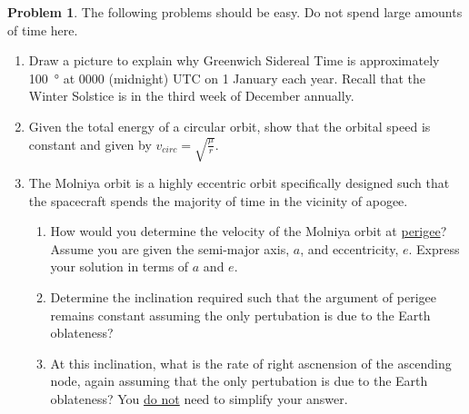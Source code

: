 \documentclass[10pt]{article}
\theoremstyle{definition}
\newtheorem{prob}{Problem}[section]
\newenvironment{subprob}%
{\renewcommand{\theenumi}{\alph{enumi}}\renewcommand{\labelenumi}{(\theenumi)}\begin{enumerate}}%
{\end{enumerate}}%
\newcommand{\extrapage}{\clearpage\newpage\null\newpage}
\begin{document}
\begin{prob}
The following problems should be easy. 
Do not spend large amounts of time here.
\begin{subprob}
\item Draw a picture to explain why Greenwich Sidereal Time is approximately \SI{100}{\degree} at 0000 (midnight) UTC on 1 January each year.
    Recall that the Winter Solstice is in the third week of December annually.

    \vspace{8cm}
\item Given the total energy of a circular orbit, show that the orbital speed is constant and given by \( v_{circ} = \sqrt{\frac{\mu}{r}}\).

    \vspace{5cm}

\item The Molniya orbit is a highly eccentric orbit specifically designed such that the spacecraft spends the majority of time in the vicinity of apogee.

    \begin{subprob}

    \item How would you determine the velocity of the Molniya orbit  at \underline{perigee}?
    Assume you are given the semi-major axis, \( a \), and eccentricity, \( e\).
    Express your solution in terms of \( a \) and \( e\).

    \vspace{4cm}

        \item Determine the inclination required such that the argument of perigee remains constant assuming the only pertubation is due to the Earth oblateness?

            \vspace{5cm}
        \item At this inclination, what is the rate of right ascnension of the ascending node, again assuming that the only pertubation is due to the Earth oblateness? 
            You \underline{do not} need to simplify your answer.
    \end{subprob}
\end{subprob}
\end{prob}

\extrapage
\extrapage
\end{document}
